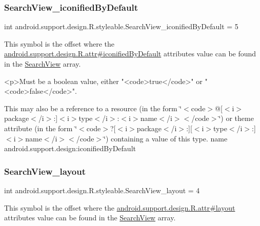 \subsubsection{\texorpdfstring{Search\+View\+\_\+iconified\+By\+Default}{SearchView\_iconifiedByDefault}}
{\footnotesize\ttfamily int android.\+support.\+design.\+R.\+styleable.\+Search\+View\+\_\+iconified\+By\+Default = 5\hspace{0.3cm}{\ttfamily [static]}}

This symbol is the offset where the \hyperlink{classandroid_1_1support_1_1design_1_1R_1_1attr_a6e1cf27cdba92453a20269f73165859b}{android.\+support.\+design.\+R.\+attr\#iconified\+By\+Default} attribute\textquotesingle{}s value can be found in the \hyperlink{classandroid_1_1support_1_1design_1_1R_1_1styleable_a8f7e72dc1bf854e14c1be7dbc1cb7392}{Search\+View} array.

\begin{DoxyVerb}      <p>Must be a boolean value, either "<code>true</code>" or "<code>false</code>".
\end{DoxyVerb}
 

This may also be a reference to a resource (in the form \char`\"{}$<$code$>$@\mbox{[}$<$i$>$package$<$/i$>$\+:\mbox{]}$<$i$>$type$<$/i$>$\+:$<$i$>$name$<$/i$>$$<$/code$>$\char`\"{}) or theme attribute (in the form \char`\"{}$<$code$>$?\mbox{[}$<$i$>$package$<$/i$>$\+:\mbox{]}\mbox{[}$<$i$>$type$<$/i$>$\+:\mbox{]}$<$i$>$name$<$/i$>$$<$/code$>$\char`\"{}) containing a value of this type.  name android.\+support.\+design\+:iconified\+By\+Default \mbox{\label{classandroid_1_1support_1_1design_1_1R_1_1styleable_a508458355c8e4fb9a6661d806c0ec352}} 
\subsubsection{\texorpdfstring{Search\+View\+\_\+layout}{SearchView\_layout}}
{\footnotesize\ttfamily int android.\+support.\+design.\+R.\+styleable.\+Search\+View\+\_\+layout = 4\hspace{0.3cm}{\ttfamily [static]}}

This symbol is the offset where the \hyperlink{classandroid_1_1support_1_1design_1_1R_1_1attr_a88b4b57756f226e933f01f855538b081}{android.\+support.\+design.\+R.\+attr\#layout} attribute\textquotesingle{}s value can be found in the \hyperlink{classandroid_1_1support_1_1design_1_1R_1_1styleable_a8f7e72dc1bf854e14c1be7dbc1cb7392}{Search\+View} array.

